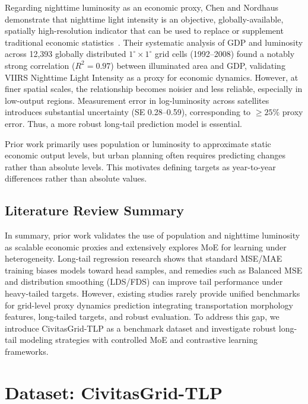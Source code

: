 \documentclass[pdflatex,sn-basic,Numbered]{sn-jnl}
\begin{document}
Regarding nighttime luminosity as an economic proxy, Chen and Nordhaus demonstrate that nighttime light intensity is an objective, globally-available, spatially high-resolution indicator that can be used to replace or supplement traditional economic statistics~\cite{chen2011luminosity}. Their systematic analysis of GDP and luminosity across 12,393 globally distributed $1^{\circ} \times 1^{\circ}$ grid cells (1992--2008) found a notably strong correlation ($R^2 = 0.97$) between illuminated area and GDP, validating VIIRS Nighttime Light Intensity as a proxy for economic dynamics. However, at finer spatial scales, the relationship becomes noisier and less reliable, especially in low-output regions. Measurement error in log-luminosity across satellites introduces substantial uncertainty (SE 0.28--0.59), corresponding to $\ge 25\%$ proxy error. Thus, a more robust long-tail prediction model is essential.

Prior work primarily uses population or luminosity to approximate static economic output levels, but urban planning often requires predicting changes rather than absolute levels. This motivates defining targets as year-to-year differences rather than absolute values.

\subsection{Literature Review Summary}

In summary, prior work validates the use of population and nighttime luminosity as scalable economic proxies and extensively explores MoE for learning under heterogeneity. Long-tail regression research shows that standard MSE/MAE training biases models toward head samples, and remedies such as Balanced MSE and distribution smoothing (LDS/FDS) can improve tail performance under heavy-tailed targets. However, existing studies rarely provide unified benchmarks for grid-level proxy dynamics prediction integrating transportation morphology features, long-tailed targets, and robust evaluation. To address this gap, we introduce CivitasGrid-TLP as a benchmark dataset and investigate robust long-tail modeling strategies with controlled MoE and contrastive learning frameworks.



\section{Dataset: CivitasGrid-TLP}
\end{document}
